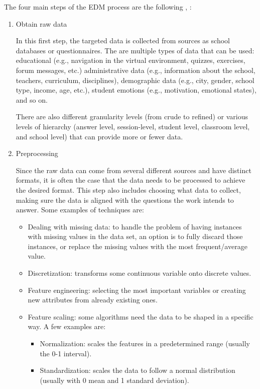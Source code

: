 The four main steps of the EDM process are the following \cite{sokkhey2020developing}, \cite{romero2020educational}:

\begin{enumerate}
    \item Obtain raw data
    
    In this first step, the targeted data is collected from sources as school databases or questionnaires. The are multiple types of data that can be used: educational (e.g., navigation in the virtual environment, quizzes, exercises, forum messages, etc.) administrative data (e.g., information about the school, teachers, curriculum, disciplines), demographic data (e.g., city, gender, school type, income, age, etc.), student emotions (e.g., motivation, emotional states), and so on.
    
    There are also different granularity levels (from crude to refined) or various levels of hierarchy (answer level, session-level, student level, classroom level, and school level) that can provide more or fewer data.
    
    \item Preprocessing
    
    Since the raw data can come from several different sources and have distinct formats, it is often the case that the data needs to be processed to achieve the desired format. This step also includes choosing what data to collect, making sure the data is aligned with the questions the work intends to answer. Some examples of techniques are: 
    \begin{itemize}
        \item Dealing with missing data: to handle the problem of having instances with missing values in the data set, an option is to fully discard those instances, or replace the missing values with the most frequent/average value.
        \item Discretization: transforms some continuous variable onto discrete values.
        \item Feature engineering: selecting the most important variables or creating new attributes from already existing ones.
        \item Feature scaling: some algorithms need the data to be shaped in a specific way. A few examples are:
        \begin{itemize}
            \item Normalization: scales the features in a predetermined range (usually the 0-1 interval).
            \item Standardization: scales the data to follow a normal distribution (usually with 0 mean and 1 standard deviation).
        \end{itemize}
    \end{itemize}
    

\end{enumerate}
